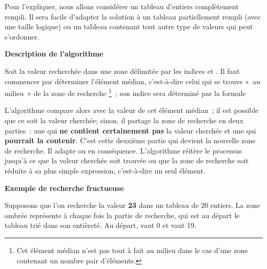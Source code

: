 		Pour l’expliquer, nous allons considérer un tableau d’entiers
		complètement rempli.  Il sera facile d’adapter la solution à un tableau
		partiellement rempli (avec une taille logique) ou un tableau contenant
		tout autre type de valeurs qui peut s’ordonner.
		
		{\sffamily\bfseries\upshape
		Description de l’algorithme}
	
		Soit  la valeur recherchée dans une zone délimitée 
		par les indices  et . 
		Il faut commencer par déterminer l’élément médian, 
		c’est-à-dire celui qui se trouve «~au milieu~» 
		de la zone de recherche%
		\footnote{%
			Cet élément médian n’est pas tout à fait au milieu 
			dans le cas d’une zone contenant un nombre pair d’éléments.
		}~; 
		son indice sera déterminé par la formule
	
		{\centering
		\par{}
		}

		L'algorithme compare alors  avec la valeur de cet élément
		médian~; il est possible que ce soit la valeur cherchée; sinon, il
		partage la zone de recherche en deux parties~: une qui \textbf{ne
		contient certainement pas} la valeur cherchée et une qui
		\textbf{pourrait la contenir}.  C’est cette deuxième partie qui devient
		la nouvelle zone de recherche.  Il adapte  ou
		 en conséquence.  L'algorithme réitère le processus
		jusqu’à ce que la valeur cherchée soit trouvée ou que la zone de
		recherche soit réduite à sa plus simple expression, c’est-à-dire un seul
		élément.
			
		{\sffamily\bfseries\upshape
		Exemple de recherche fructueuse}

		Supposons que l’on recherche la valeur \textbf{23} dans un tableau de 20
		entiers.  La zone ombrée représente à chaque fois la partie de
		recherche, qui est au départ le tableau trié dans son entièreté.  Au
		départ,  vaut 0 et  vaut 19.

